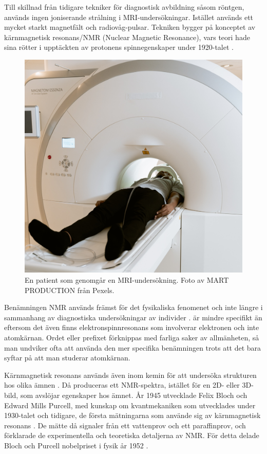 \documentclass[11pt, a4paper]{article}
\begin{document}
Till skillnad från tidigare tekniker för diagnostisk avbildning såsom röntgen, används ingen joniserande strålning i MRI-undersökningar. Istället används ett mycket starkt magnetfält och radiovåg-pulsar. Tekniken bygger på konceptet av kärnmagnetisk resonans/NMR (Nuclear Magnetic Resonance), vars teori hade sina rötter i upptäckten av protonens spinnegenskaper under 1920-talet \parencite{mri_lärobok}.

\begin{figure}[ht]
	\centering
	\includegraphics[width=.7\textwidth]{mri_patient}
	\caption{En patient som genomgår en MRI-undersökning. Foto av MART PRODUCTION \parencite*{fig:mri_patient} från Pexels.}
	\label{fig:mri_patient}
\end{figure}

Benämningen NMR används främst för det fysikaliska fenomenet och inte längre i sammanhang av diagnostiska undersökningar av individer \parencite{nmr_eller_mri}.  är mindre specifikt än  eftersom det även finns elektronspinnresonans som involverar elektronen och inte atomkärnan. Ordet  eller prefixet  förknippas med farliga saker av allmänheten, så man undviker ofta att använda den mer specifika benämningen trots att det bara syftar på att man studerar atomkärnan.

Kärnmagnetisk resonans används även inom kemin för att undersöka strukturen hos olika ämnen \parencite{nmr_kemi}. Då produceras ett NMR-spektra, istället för en 2D- eller 3D-bild, som avslöjar egenskaper hos ämnet. År 1945 utvecklade Felix Bloch och Edward Mills Purcell, med kunskap om kvantmekaniken som utvecklades under 1930-talet och tidigare, de första mätningarna som använde sig av kärnmagnetisk resonans \parencite{mri_lärobok}. De mätte då signaler från ett vattenprov och ett paraffinprov, och förklarade de experimentella och teoretiska detaljerna av NMR. För detta delade Bloch och Purcell nobelpriset i fysik år 1952 \parencite{nmr_nobelpris}.
\end{document}
